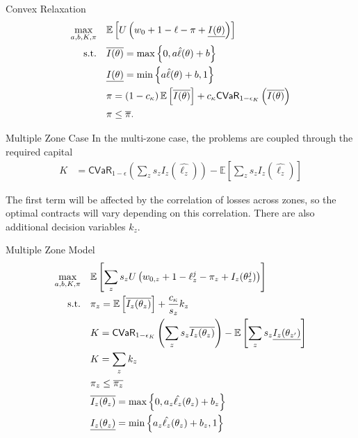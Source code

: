 \documentclass{beamer}
\begin{document}
\begin{frame}{Convex Relaxation}
    \begin{align}
        \max_{a,b,K,\pi} &\quad \mathbb{E} \left [  U\left(w_0 + 1 - \ell - \pi  +  \underline{I(\theta)} \right) \right ]\label{eq-06}\\
        \text{s.t.} & \quad \overline{I(\theta)} = \max \left \{0,a\hat{\ell}(\theta) + b \right \} \nonumber\\
        & \quad \underline{I(\theta)} = \min \left \{a\hat{\ell}(\theta)+b,1 \right \} \nonumber\\
        & \quad \pi = \left (1-c_{\kappa} \right ) \mathbb{E} \left [ \overline{I(\theta)} \right ] + c_{\kappa} {\sf CVaR}_{1-\epsilon_K} \left( \overline{I(\theta)} \right) \label{eq-41}\\
        & \quad \pi \leq \overline{\pi} \nonumber.
  \end{align}
    
\end{frame}

\begin{frame}{Multiple Zone Case}
    In the multi-zone case, the problems are coupled through the required capital
    \begin{align*}
        K &= \textsf{CVaR}_{1-\epsilon} \left ( \sum_z s_z I_z(\hat{\ell_z}) \right ) - \mathbb{E}\left [\sum_z s_z I_z(\hat{\ell_z}) \right ]
    \end{align*}

    The first term will be affected by the correlation of losses across zones, so the optimal contracts will vary depending on this correlation. There are also additional decision variables $k_z$. 
    
\end{frame}

\begin{frame}{Multiple Zone Model}
    \begin{align}
        \max_{a,b,K,\pi} &\quad \mathbb{E}\left [ \sum_z s_z U\left ( w_{0,z} + 1 -\ell_z^j -\pi_z + I_z(\theta^j_z) \right ) \right ]\nonumber\\
        \text{s.t.} &\quad \pi_z  = \mathbb{E}\left [ \overline{I_z(\theta_z)} \right ] + \frac{c_{\kappa}}{s_z}  k_z\\
        &\quad K = {\sf CVaR}_{1-\epsilon_K} \left ( \sum_z s_z\overline{I_z(\theta_z)} \right ) - \mathbb{E}\left [ \sum_{z} s_{z}\underline{I_{z}(\theta_{z'})} \right ]\\
        &\quad K = \sum_z k_z\\
        &\quad\pi_z \leq \overline{\pi_z}\\
        &\quad \overline{I_z(\theta_z)} = \max \left \{0,a_z\hat{\ell_z}(\theta_z) + b_z \right \} \nonumber\\
        &\quad\underline{I_z(\theta_z)} = \min \left \{a_z\hat{\ell_z}(\theta_z)+b_z,1 \right \} \nonumber
      \end{align}
\end{frame}
\end{document}
